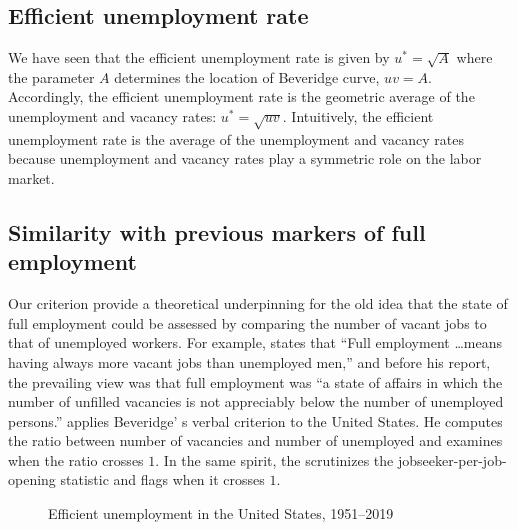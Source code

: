 \documentclass[letterpaper,12pt,leqno]{article}
\newcommand{\pdf}{figures.pdf}
\begin{document}
\subsection{Efficient unemployment rate}

We have seen that the efficient unemployment rate is given by $u^* = \sqrt{A}$ where the parameter $A$ determines the location of Beveridge curve, $uv = A$. Accordingly, the efficient unemployment rate is the geometric average of the unemployment and vacancy rates: $u^* = \sqrt{uv}$. Intuitively, the efficient unemployment rate is the average of the unemployment and vacancy rates because unemployment and vacancy rates play a symmetric role on the labor market.

\subsection{Similarity with previous markers of full employment}

Our criterion provide a theoretical underpinning for the old idea that the state of full employment could be assessed by comparing the number of vacant jobs to that of unemployed workers. For example,  \citet[p. 18]{B44} states that ``Full employment \dots means having always more vacant jobs than unemployed men,'' and before his report, the prevailing view was that full employment was ``a state of affairs in which the number of unfilled vacancies is not appreciably below the number of unemployed persons.'' \citet[p. 39 and chart 5]{R57} applies Beveridge' s verbal criterion to the United States. He computes the ratio between number of vacancies and number of unemployed and examines when the ratio crosses $1$. In the same spirit, the \citet{BLS22} scrutinizes the jobseeker-per-job-opening statistic and flags when it crosses $1$.

\begin{figure}[t]
\hfill
{}
\caption{Efficient unemployment in the United States, 1951--2019}
\label{f:squareroot1951}\end{figure}
\end{document}
